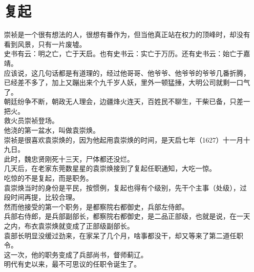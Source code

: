 \section{复起}
\ifnum{}
	\begin{multicols}{\theparacolNo}
\fi
崇祯是一个很有想法的人，很想有番作为，但当他真正站在权力的顶峰时，却没有看到风景，只有一片废墟。\\

史书有云：明之亡，亡于天启。也有史书云：实亡于万历。还有史书云：始亡于嘉靖。\\

应该说，这几句话都是有道理的，经过他哥哥、他爷爷、他爷爷的爷爷几番折腾，已经差不多了，加上又蹦出来个九千岁人妖，里外一顿猛捶，大明公司就剩一口气了。\\

朝廷纷争不断，朝政无人理会，边疆烽火连天，百姓民不聊生，干柴已备，只差一把火。\\

救火员崇祯登场。\\

他浇的第一盆水，叫做袁崇焕。\\

崇祯是很喜欢袁崇焕的，因为他起用袁崇焕的时间，是天启七年（1627）十一月十九日。\\

此时，魏忠贤刚死十三天，尸体都还没烂。\\

几天后，在老家东莞数星星的袁崇焕接到了复起任职通知，大吃一惊。\\

吃惊的不是复起，而是职务。\\

袁崇焕当时的身份是平民，按惯例，复起也得有个级别，先干个主事（处级），过段时间再提，比较合理。\\

然而他接受的第一个职务，是都察院右都御史，兵部左侍郎。\\

兵部右侍郎，是兵部副部长，都察院右都御史，是二品正部级，也就是说，在一天之内，布衣袁崇焕就变成了正部级副部长。\\

袁部长明显没缓过劲来，在家呆了几个月，啥事都没干，却又等来了第二道任职令。\\

这一次，他的职务变成了兵部尚书，督师蓟辽。\\

明代有史以来，最不可思议的任职令诞生了。\\


\end{multicols}
